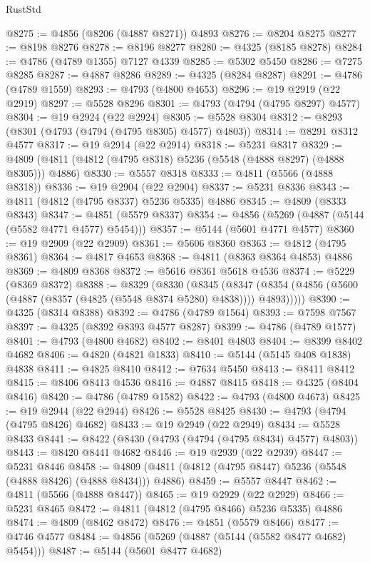 \begin{lexlean}{RustStd}
\begin{coremodule}
{\begin{coremodule}
{{{{{{{{{{{{{{{{{{{{{{{{{{{{{{{{{{{{{{{{{{{{{{{{{{{{{{{{{{{{{{{{{{{{{{{{{{{{{{{{@8275 := @4856 (@8206 (@4887 @8271)) @4893
@8276 := @8204 @8275
@8277 := @8198 @8276
@8278 := @8196 @8277
@8280 := @4325 (@8185 @8278)
@8284 := @4786 (@4789 @1355) @7127 @4339
@8285 := @5302 @5450
@8286 := @7275 @8285
@8287 := @4887 @8286
@8289 := @4325 (@8284 @8287)
@8291 := @4786 (@4789 @1559)
@8293 := @4793 (@4800 @4653)
@8296 := @19 @2919 (@22 @2919)
@8297 := @5528 @8296
@8301 := @4793 (@4794 (@4795 @8297) @4577)
@8304 := @19 @2924 (@22 @2924)
@8305 := @5528 @8304
@8312 := @8293 (@8301 (@4793 (@4794 (@4795 @8305) @4577) @4803))
@8314 := @8291 @8312 @4577
@8317 := @19 @2914 (@22 @2914)
@8318 := @5231 @8317
@8329 := @4809 (@4811 (@4812 (@4795 @8318) @5236 (@5548 (@4888 @8297) (@4888 @8305))) @4886)
@8330 := @5557 @8318
@8333 := @4811 (@5566 (@4888 @8318))
@8336 := @19 @2904 (@22 @2904)
@8337 := @5231 @8336
@8343 := @4811 (@4812 (@4795 @8337) @5236 @5335) @4886
@8345 := @4809 (@8333 @8343)
@8347 := @4851 (@5579 @8337)
@8354 := @4856 (@5269 (@4887 (@5144 (@5582 @4771 @4577) @5454)))
@8357 := @5144 (@5601 @4771 @4577)
@8360 := @19 @2909 (@22 @2909)
@8361 := @5606 @8360
@8363 := @4812 (@4795 @8361)
@8364 := @4817 @4653
@8368 := @4811 (@8363 @8364 @4853) @4886
@8369 := @4809 @8368
@8372 := @5616 @8361 @5618 @4536
@8374 := @5229 (@8369 @8372)
@8388 := @8329
    (@8330
      (@8345
        (@8347 (@8354 (@4856 (@5600 (@4887 (@8357 (@4825 (@5548 @8374 @5280) @4838)))) @4893)))))
@8390 := @4325 (@8314 @8388)
@8392 := @4786 (@4789 @1564)
@8393 := @7598 @7567
@8397 := @4325 (@8392 @8393 @4577 @8287)
@8399 := @4786 (@4789 @1577)
@8401 := @4793 (@4800 @4682)
@8402 := @8401 @4803
@8404 := @8399 @8402 @4682
@8406 := @4820 (@4821 @1833)
@8410 := @5144 (@5145 @408 @1838) @4838
@8411 := @4825 @8410
@8412 := @7634 @5450
@8413 := @8411 @8412
@8415 := @8406 @8413 @4536
@8416 := @4887 @8415
@8418 := @4325 (@8404 @8416)
@8420 := @4786 (@4789 @1582)
@8422 := @4793 (@4800 @4673)
@8425 := @19 @2944 (@22 @2944)
@8426 := @5528 @8425
@8430 := @4793 (@4794 (@4795 @8426) @4682)
@8433 := @19 @2949 (@22 @2949)
@8434 := @5528 @8433
@8441 := @8422 (@8430 (@4793 (@4794 (@4795 @8434) @4577) @4803))
@8443 := @8420 @8441 @4682
@8446 := @19 @2939 (@22 @2939)
@8447 := @5231 @8446
@8458 := @4809 (@4811 (@4812 (@4795 @8447) @5236 (@5548 (@4888 @8426) (@4888 @8434))) @4886)
@8459 := @5557 @8447
@8462 := @4811 (@5566 (@4888 @8447))
@8465 := @19 @2929 (@22 @2929)
@8466 := @5231 @8465
@8472 := @4811 (@4812 (@4795 @8466) @5236 @5335) @4886
@8474 := @4809 (@8462 @8472)
@8476 := @4851 (@5579 @8466)
@8477 := @4746 @4577
@8484 := @4856 (@5269 (@4887 (@5144 (@5582 @8477 @4682) @5454)))
@8487 := @5144 (@5601 @8477 @4682)
}}}}}}}}}}}}}}}}}}}}}}}}}}}}}}}}}}}}}}}}}}}}}}}}}}}}}}}}}}}}}}}}}}}}}}}}}}}}}}}}
\end{coremodule}}
\end{coremodule}
\end{lexlean}
